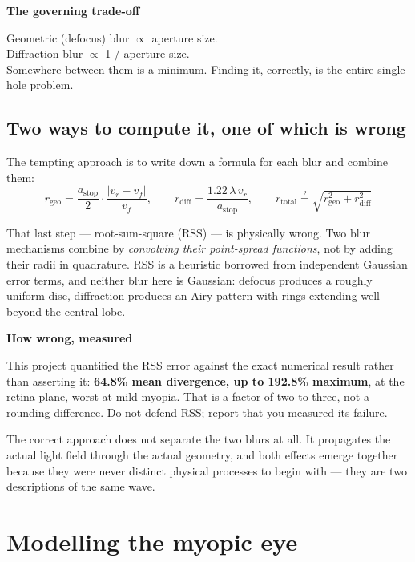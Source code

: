 \documentclass[11pt]{report}
\newenvironment{keybox}[1]%
{\par\vspace{8pt}\begin{lrbox}{\kbsave}\begin{minipage}{0.88\textwidth}%
{\bfseries\color{hbblue}#1}\par\vspace{4pt}\ignorespaces}%
{\end{minipage}\end{lrbox}%
\begin{center}\setlength{\fboxrule}{1.2pt}\setlength{\fboxsep}{8pt}%
\fcolorbox{hbblue}{boxgrey}{\usebox{\kbsave}}\end{center}\vspace{8pt}\par}
\newenvironment{warnbox}[1]%
{\par\vspace{8pt}\begin{lrbox}{\wbsave}\begin{minipage}{0.88\textwidth}%
{\bfseries\color{warnred}#1}\par\vspace{4pt}\ignorespaces}%
{\end{minipage}\end{lrbox}%
\begin{center}\setlength{\fboxrule}{1.2pt}\setlength{\fboxsep}{8pt}%
\fcolorbox{warnred}{white}{\usebox{\wbsave}}\end{center}\vspace{8pt}\par}
\newcommand{\vr}{v_r}
\newcommand{\vf}{v_f}
\begin{document}
\begin{keybox}{The governing trade-off}
Geometric (defocus) blur $\propto$ aperture size. \\
Diffraction blur $\propto$ 1 / aperture size. \\
Somewhere between them is a minimum. Finding it, correctly, is the entire single-hole problem.
\end{keybox}

\section{Two ways to compute it, one of which is wrong}

The tempting approach is to write down a formula for each blur and combine them:
\begin{equation}
r_{\text{geo}} = \frac{a_{\text{stop}}}{2}\cdot\frac{|\vr-\vf|}{\vf},
\qquad
r_{\text{diff}} = \frac{1.22\,\lambda\,\vr}{a_{\text{stop}}},
\qquad
r_{\text{total}} \overset{?}{=} \sqrt{r_{\text{geo}}^2+r_{\text{diff}}^2}
\end{equation}

That last step --- root-sum-square (RSS) --- is physically wrong. Two blur mechanisms combine
by \emph{convolving their point-spread functions}, not by adding their radii in quadrature.
RSS is a heuristic borrowed from independent Gaussian error terms, and neither blur here is
Gaussian: defocus produces a roughly uniform disc, diffraction produces an Airy pattern with
rings extending well beyond the central lobe.

\begin{warnbox}{How wrong, measured}
This project quantified the RSS error against the exact numerical result rather than asserting
it: \textbf{64.8\% mean divergence, up to 192.8\% maximum}, at the retina plane, worst at mild
myopia. That is a factor of two to three, not a rounding difference. Do not defend RSS; report
that you measured its failure.
\end{warnbox}

The correct approach does not separate the two blurs at all. It propagates the actual light
field through the actual geometry, and both effects emerge together because they were never
distinct physical processes to begin with --- they are two descriptions of the same wave.

\chapter{Modelling the myopic eye}
\end{document}
